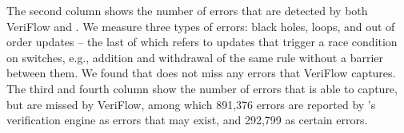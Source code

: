 The second column shows the number of errors that are detected by both VeriFlow and \name. 
We measure three types of errors: black holes, loops, and out of order updates -- the last of which refers to updates that trigger a race condition on switches, e.g., addition and withdrawal of the same rule without a barrier between them. 
We found that \name does not miss any errors that VeriFlow captures. The third and fourth column show the number of  errors that \name is able to capture, but are missed by VeriFlow, among which 891,376 errors are reported by \name's verification engine as errors that may exist, and 292,799 as certain errors. 
\fi
%
%
%
%

